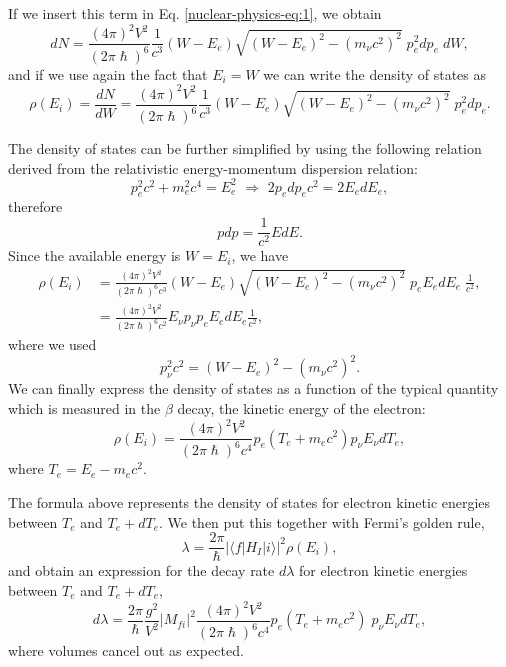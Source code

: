 If we insert this term in  Eq. \eqref{nuclear-physics-eq:1}, we obtain
\begin{equation*}
    dN = \frac{(4\pi)^2V^2}{(2\pi\hslash)^6}\frac{1}{c^3}(W-E_e)\sqrt{(W-E_e)^2 - (m_{\nu}c^2)^2} \; p_e^2dp_e\; dW,
\end{equation*}
and if we use again the fact that $E_i = W$ we can write the density of states as
\begin{equation*}
    \rho(E_i) = \frac{dN}{dW} = \frac{(4\pi)^2V^2}{(2\pi\hslash)^6}\frac{1}{c^3}(W-E_e)\sqrt{(W-E_e)^2 - (m_{\nu}c^2)^2} \; p_e^2dp_e.
\end{equation*}

The density of states can be further simplified by using the following relation derived from the relativistic energy-momentum dispersion relation:
\begin{equation*}
    p_e^2c^2 + m_e^2c^4 = E_e^2\,\,\Rightarrow\,\, 2p_edp_ec^2 = 2E_edE_e,
\end{equation*}
therefore
\begin{equation*}
    pdp = \frac{1}{c^2}EdE.
\end{equation*}
Since the available energy is $W = E_i$, we have
\begin{align*}
   \rho(E_i)&= \frac{(4\pi)^2V^2}{(2\pi\hslash)^6c^3}(W-E_e)\sqrt{(W-E_e)^2 - (m_{\nu}c^2)^2} \; p_e E_e dE_e \; \frac{1}{c^2},\\
    &= \frac{(4\pi)^2V^2}{(2\pi\hslash)^6c^2} E_{\nu} p_{\nu} p_e E_e dE_e \frac{1}{c^2},
\end{align*}
where we used
\begin{equation*}
    p_\nu^2 c^2 = (W-E_e)^2 - (m_\nu c^2)^2.
\end{equation*}
We can finally express the density of states as a function of the typical quantity which is measured in the \(\beta\) decay, the kinetic energy of the electron: 
\begin{equation*}
    \rho (E_i) = \frac{(4\pi)^2V^2}{(2\pi\hslash)^6c^4} p_e(T_e + m_ec^2)p_\nu E_\nu dT_e,
\end{equation*}
where $T_e = E_e - m_ec^2$.

The formula above represents the density of states for electron kinetic energies between $T_e$ and $T_e+ dT_e$. We then put this together with  Fermi's golden rule, 
\begin{equation*}
    \lambda = \frac{2\pi}{\hslash} |\langle f | H_I | i \rangle |^2 \rho(E_i),
\end{equation*}
and obtain an expression for the decay rate $d\lambda$ for electron kinetic energies between $T_e$ and $T_e+ dT_e$,
\begin{equation}
\label{eq:ElementRate}
    d\lambda = \frac{2\pi}{\hslash}\frac{g^2}{V^2}|M_{fi}|^2 \frac{(4\pi)^2V^2}{(2\pi\hslash)^6 c^4} p_e(T_e + m_ec^2) \; p_\nu E_\nu dT_e,
\end{equation}
where volumes cancel out as expected.

